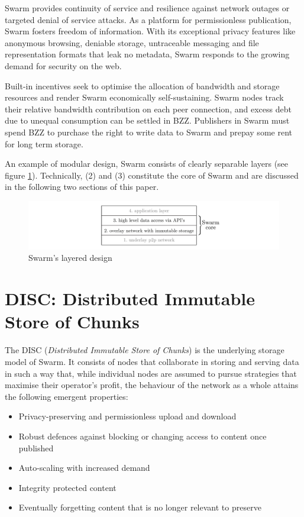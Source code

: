 \documentclass[12pt,a4paper]{article}
\begin{document}
Swarm provides continuity of service and resilience against network outages or targeted denial of service attacks. As a platform for permissionless publication, Swarm fosters freedom of information. With its exceptional privacy features like anonymous browsing, deniable storage, untraceable messaging and file representation formats that leak no metadata, Swarm responds to the growing demand for security on the web. 

Built-in incentives seek to optimise the allocation of bandwidth and storage resources and render Swarm economically self-sustaining. Swarm nodes track their relative bandwidth contribution on each peer connection, and excess debt due to unequal consumption can be settled in BZZ. Publishers in Swarm must spend BZZ to purchase the right to write data to Swarm and prepay some rent for long term storage.

An example of modular design, 
Swarm consists of clearly separable layers (see figure \ref{fig:Swarm-layered-design}).
Technically, (2) and (3) constitute the core of Swarm and are discussed in the following two sections of this paper.

\begin{figure}[htbp]
  \centering
    \includegraphics[width=\textwidth]{fig2/swarm-layered-design.pdf}
  \caption[Swarm's layered design]{Swarm's layered design}
\label{fig:Swarm-layered-design}
\end{figure}    


\section{DISC: Distributed Immutable Store of Chunks}
The DISC (\/\emph{Distributed Immutable Store of Chunks}) is the underlying storage model of Swarm. It consists of nodes that collaborate in storing and serving data in such a way that, while individual nodes are assumed to pursue strategies that maximise their operator's profit, the behaviour of the network as a whole attains the following emergent properties:

\begin{itemize}
    \item 
Privacy-preserving and permissionless upload and download
\item
Robust defences against blocking or changing access to content once published
\item
Auto-scaling with increased demand
\item 
Integrity protected content
\item 
Eventually forgetting content that is no longer relevant to preserve
\end{itemize}
\end{document}

